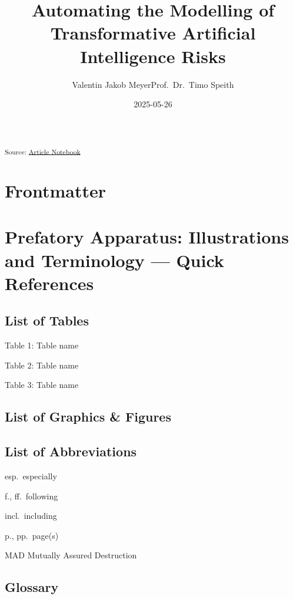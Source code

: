 \documentclass[11pt,a4paper]{report}
\title{Automating the Modelling of Transformative Artificial
Intelligence Risks}
\author{Valentin Jakob MeyerProf.~Dr.~Timo Speith}
\date{2025-05-26}
\begin{document}


\textsubscript{Source:
\href{https://VJMeyer.github.io/submission/thesis.qmd.html}{Article
Notebook}}

\section{}\label{section}

\section{Frontmatter}\label{frontmatter}

\section{Prefatory Apparatus: Illustrations and Terminology --- Quick
References}\label{prefatory-apparatus-illustrations-and-terminology-quick-references}

\subsection{List of Tables}\label{list-of-tables}

Table 1: Table name

Table 2: Table name

Table 3: Table name

\subsection{List of Graphics \& Figures}\label{list-of-graphics-figures}

\subsection{List of Abbreviations}\label{list-of-abbreviations}

esp.~especially

f., ff.~following

incl.~including

p., pp.~page(s)

MAD Mutually Assured Destruction

\subsection{Glossary}\label{glossary}
\end{document}
